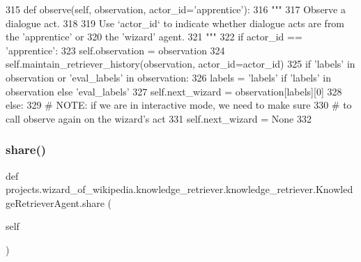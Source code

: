 \begin{DoxyCode}
315     \textcolor{keyword}{def }observe(self, observation, actor\_id='apprentice'):
316         \textcolor{stringliteral}{"""}
317 \textcolor{stringliteral}{        Observe a dialogue act.}
318 \textcolor{stringliteral}{}
319 \textcolor{stringliteral}{        Use `actor\_id` to indicate whether dialogue acts are from the 'apprentice' or}
320 \textcolor{stringliteral}{        the 'wizard' agent.}
321 \textcolor{stringliteral}{        """}
322         \textcolor{keywordflow}{if} actor\_id == \textcolor{stringliteral}{'apprentice'}:
323             self.observation = observation
324         self.maintain\_retriever\_history(observation, actor\_id=actor\_id)
325         \textcolor{keywordflow}{if} \textcolor{stringliteral}{'labels'} \textcolor{keywordflow}{in} observation \textcolor{keywordflow}{or} \textcolor{stringliteral}{'eval\_labels'} \textcolor{keywordflow}{in} observation:
326             labels = \textcolor{stringliteral}{'labels'} \textcolor{keywordflow}{if} \textcolor{stringliteral}{'labels'} \textcolor{keywordflow}{in} observation \textcolor{keywordflow}{else} \textcolor{stringliteral}{'eval\_labels'}
327             self.next\_wizard = observation[labels][0]
328         \textcolor{keywordflow}{else}:
329             \textcolor{comment}{# NOTE: if we are in interactive mode, we need to make sure}
330             \textcolor{comment}{# to call observe again on the wizard's act}
331             self.next\_wizard = \textcolor{keywordtype}{None}
332 
\end{DoxyCode}
\mbox{\label{classprojects_1_1wizard__of__wikipedia_1_1knowledge__retriever_1_1knowledge__retriever_1_1KnowledgeRetrieverAgent_a1befed09274e61e1872da0a0d8bf9804}} 
\subsubsection{\texorpdfstring{share()}{share()}}
{\footnotesize\ttfamily def projects.\+wizard\+\_\+of\+\_\+wikipedia.\+knowledge\+\_\+retriever.\+knowledge\+\_\+retriever.\+Knowledge\+Retriever\+Agent.\+share (\begin{DoxyParamCaption}\item[{}]{self }\end{DoxyParamCaption})}



